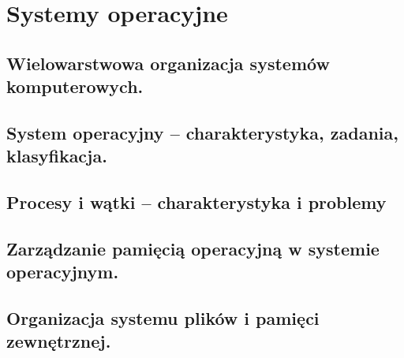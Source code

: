 \chapter{Systemy operacyjne}
\section{Wielowarstwowa organizacja systemów komputerowych.}
\section{System operacyjny – charakterystyka, zadania, klasyfikacja. }
\section{Procesy i wątki – charakterystyka i problemy}
\section{Zarządzanie pamięcią operacyjną w systemie operacyjnym.}
\section{Organizacja systemu plików i pamięci zewnętrznej.}